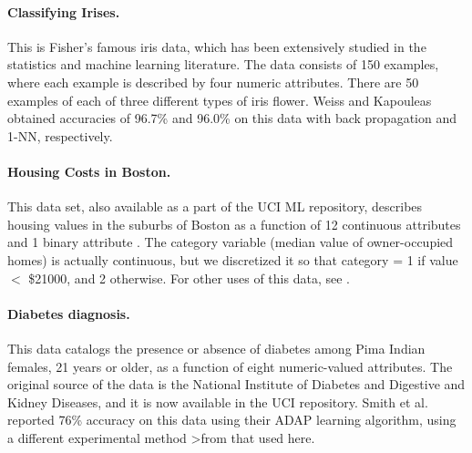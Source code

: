 \paragraph{Classifying Irises.}
This is Fisher's famous iris data, which has been extensively studied
in the statistics and machine learning literature. 
The data consists of 150 examples, where each example is described by
four numeric attributes.  There are 50 examples of each of three
different types of iris flower.  Weiss and Kapouleas
\citeyear{weiss/kapouleas/89} obtained accuracies of 96.7\% and 96.0\% on
this data with back propagation and 1-NN, respectively.

\paragraph{Housing Costs in Boston.}
This data set, also available as a part of the UCI ML repository,
describes housing values in the suburbs of Boston as a function of 12
continuous attributes and 1 binary attribute
\cite{harrison/rubinfeld/78}.  The category variable (median value of
owner-occupied homes) is actually continuous, but we discretized it so
that category = 1 if value $<$ \$21000, and 2 otherwise.  For other
uses of this data, see \cite{belsley/80,quinlan/93a}.

\paragraph{Diabetes diagnosis.}
This data catalogs the presence or absence of diabetes among Pima
Indian females, 21 years or older, as a function of eight
numeric-valued attributes.  The original source of the data is the
National Institute of Diabetes and Digestive and Kidney Diseases, and
it is now available in the UCI repository.  Smith et
al.~\citeyear{smith/etal/88} reported 76\% accuracy on this data using
their ADAP learning algorithm, using a different experimental method
>from that used here.

